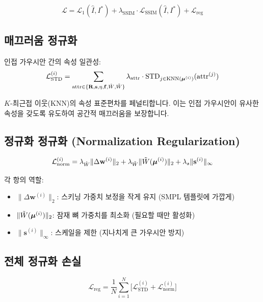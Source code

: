 \documentclass[11pt, a4paper]{report}
\begin{document}
\begin{equation}
\mathcal{L} = \mathcal{L}_1(\hat{I}, I^*) + \lambda_{\text{SSIM}} \cdot \mathcal{L}_{\text{SSIM}}(\hat{I}, I^*) + \mathcal{L}_{\text{reg}}
\end{equation}

\subsection{매끄러움 정규화}

인접 가우시안 간의 속성 일관성:
\begin{equation}
\mathcal{L}_{\text{STD}}^{(i)} = \sum_{\text{attr} \in \{\mathbf{R}, \mathbf{s}, \eta, \mathbf{f}, \hat{W}, \tilde{W}\}} \lambda_{\text{attr}} \cdot \mathrm{STD}_{j \in \mathrm{KNN}(\bm{\mu}^{(i)})}(\text{attr}^{(j)})
\label{eq:smoothness}
\end{equation}

$K$-최근접 이웃(KNN)의 속성 표준편차를 페널티합니다. 이는 인접 가우시안이 유사한 속성을 갖도록 유도하여 공간적 매끄러움을 보장합니다.

\subsection{정규화 정규화 (Normalization Regularization)}

\begin{equation}
\mathcal{L}_{\text{norm}}^{(i)} = \lambda_{\hat{W}} \|\Delta \mathbf{w}^{(i)}\|_2 + \lambda_{\tilde{W}} \|\tilde{W}(\bm{\mu}^{(i)})\|_2 + \lambda_s \|\mathbf{s}^{(i)}\|_\infty
\label{eq:norm_reg}
\end{equation}

각 항의 역할:
\begin{itemize}[leftmargin=*]
  \item $\|\Delta \mathbf{w}^{(i)}\|_2$: 스키닝 가중치 보정을 작게 유지 (SMPL 템플릿에 가깝게)
  \item $\|\tilde{W}(\bm{\mu}^{(i)})\|_2$: 잠재 뼈 가중치를 최소화 (필요할 때만 활성화)
  \item $\|\mathbf{s}^{(i)}\|_\infty$: 스케일을 제한 (지나치게 큰 가우시안 방지)
\end{itemize}

\subsection{전체 정규화 손실}

\begin{equation}
\mathcal{L}_{\text{reg}} = \frac{1}{N} \sum_{i=1}^{N} \big[ \mathcal{L}_{\text{STD}}^{(i)} + \mathcal{L}_{\text{norm}}^{(i)} \big]
\end{equation}
\end{document}
